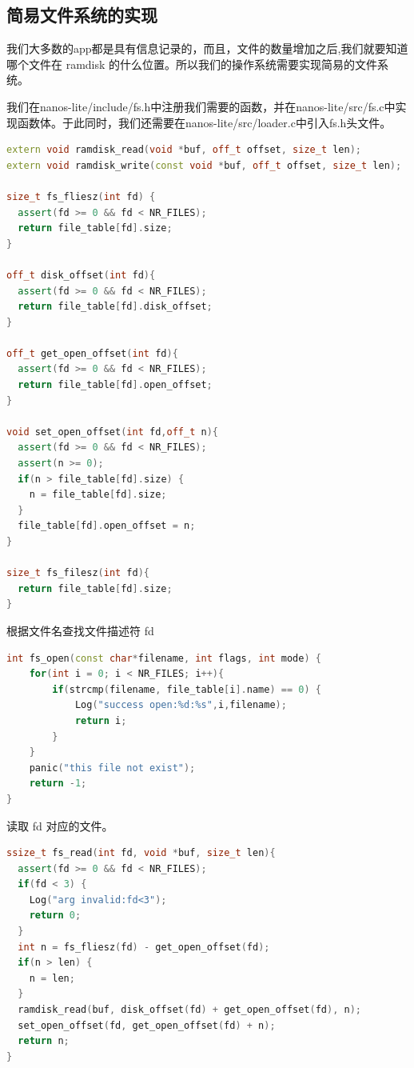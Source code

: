 \documentclass[UTF8,a4paper,10pt]{ctexart}
\begin{document}
\color{red}{这一部分，我们又遇到了一个离谱的错误，见bug记录/CS指令}
\normalcolor
\subsection{简易文件系统的实现}
我们大多数的app都是具有信息记录的，而且，文件的数量增加之后,我们就要知道哪个文件在 ramdisk 的什么位置。所以我们的操作系统需要实现简易的文件系统。

我们在nanos-lite/include/fs.h中注册我们需要的函数，并在nanos-lite/src/fs.c中实现函数体。于此同时，我们还需要在nanos-lite/src/loader.c中引入fs.h头文件。
\begin{lstlisting}[language = C++]
extern void ramdisk_read(void *buf, off_t offset, size_t len);
extern void ramdisk_write(const void *buf, off_t offset, size_t len);

size_t fs_fliesz(int fd) {
  assert(fd >= 0 && fd < NR_FILES);
  return file_table[fd].size;
}

off_t disk_offset(int fd){
  assert(fd >= 0 && fd < NR_FILES);
  return file_table[fd].disk_offset;
}

off_t get_open_offset(int fd){
  assert(fd >= 0 && fd < NR_FILES);
  return file_table[fd].open_offset;
}

void set_open_offset(int fd,off_t n){
  assert(fd >= 0 && fd < NR_FILES);
  assert(n >= 0);
  if(n > file_table[fd].size) {
    n = file_table[fd].size;
  }
  file_table[fd].open_offset = n;
} 

size_t fs_filesz(int fd){
  return file_table[fd].size;
}
\end{lstlisting}

根据文件名查找文件描述符 fd
\begin{lstlisting}[language = C++]
int fs_open(const char*filename, int flags, int mode) {
	for(int i = 0; i < NR_FILES; i++){
		if(strcmp(filename, file_table[i].name) == 0) {
			Log("success open:%d:%s",i,filename);
			return i;
		}
	}
	panic("this file not exist");
	return -1;
}
\end{lstlisting}

读取 fd 对应的文件。
\begin{lstlisting}[language = C++]
ssize_t fs_read(int fd, void *buf, size_t len){
  assert(fd >= 0 && fd < NR_FILES);
  if(fd < 3) {
    Log("arg invalid:fd<3");
    return 0;
  }
  int n = fs_fliesz(fd) - get_open_offset(fd);
  if(n > len) {
    n = len;
  }
  ramdisk_read(buf, disk_offset(fd) + get_open_offset(fd), n);
  set_open_offset(fd, get_open_offset(fd) + n);
  return n;
}
\end{lstlisting}
\end{document}
